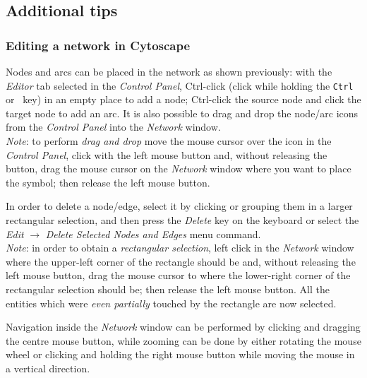 \subsection{Additional tips}
\subsubsection{Editing a network in Cytoscape}
Nodes and arcs can be placed in the network as shown previously: with the \emph{Editor} tab selected in the
\emph{Control Panel},
Ctrl-click (click while holding the {\tt Ctrl} or \maccmd\ key) in an empty place to add a node; Ctrl-click the source
node and click the target node to add an arc. It is also possible to drag and drop the node/arc icons from the \emph{Control Panel}
into the \emph{Network} window.\\
\emph{Note}: to perform \emph{drag and drop} move the mouse cursor over the icon in the \emph{Control Panel}, click with the left mouse
button and, without releasing the button, drag the mouse cursor on the \emph{Network} window where you want to
place the symbol; then release the left mouse button.

In order to delete a node/edge, select it by clicking
or grouping them in a larger rectangular selection, and then press the \emph{Delete} key on the keyboard
or select the \emph{Edit} $\rightarrow$ \emph{Delete Selected Nodes and Edges} menu command.\\
\emph{Note}: in order to obtain a \emph{rectangular selection}\label{nota:rectangular-selection},
left click in the \emph{Network} window where the upper-left corner of the rectangle should be and,
without releasing the left mouse button, drag the mouse cursor to where the lower-right corner of the
rectangular selection should be; then release the left mouse button. All the entities which were
\emph{even partially} touched by the rectangle are now selected.

Navigation inside the \emph{Network} window can be performed by clicking and dragging the centre mouse button,
while zooming can be done by either rotating the mouse wheel or clicking and holding the right mouse button
while moving the mouse in a vertical direction.

